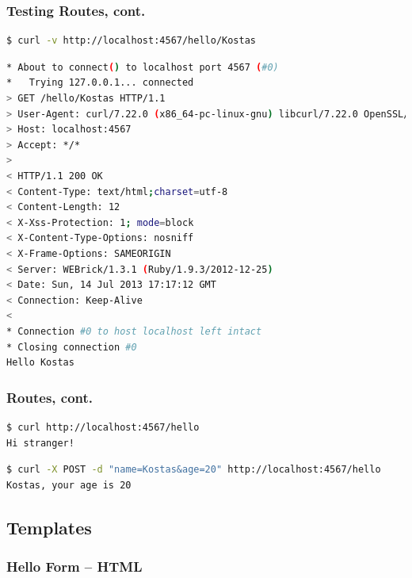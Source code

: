 \documentclass{beamer}
\begin{document}
\begin{frame}[fragile]\frametitle{Testing Routes, cont.}

  \begin{lstlisting}[language=bash, escapechar={^}]
$ curl -v http://localhost:4567/hello/Kostas
  \end{lstlisting}

  \begin{lstlisting}[language=bash, basicstyle=\tiny, escapechar={^}]
* About to connect() to localhost port 4567 (#0)
*   Trying 127.0.0.1... connected
> GET /hello/Kostas HTTP/1.1
> User-Agent: curl/7.22.0 (x86_64-pc-linux-gnu) libcurl/7.22.0 OpenSSL/1.0.1 zlib/1.2.3.4 libidn/1.23 librtmp/2.3
> Host: localhost:4567
> Accept: */*
> 
< HTTP/1.1 200 OK 
< Content-Type: text/html;charset=utf-8
< Content-Length: 12
< X-Xss-Protection: 1; mode=block
< X-Content-Type-Options: nosniff
< X-Frame-Options: SAMEORIGIN
< Server: WEBrick/1.3.1 (Ruby/1.9.3/2012-12-25)
< Date: Sun, 14 Jul 2013 17:17:12 GMT
< Connection: Keep-Alive
< 
* Connection #0 to host localhost left intact
* Closing connection #0
Hello Kostas
  \end{lstlisting}

\end{frame}




\begin{frame}[fragile]\frametitle{Routes, cont.}

  

  \begin{lstlisting}[language=bash, escapechar={^}]
$ curl http://localhost:4567/hello
Hi stranger!
  \end{lstlisting}
  
  \begin{lstlisting}[language=bash, escapechar={^}]
$ curl -X POST -d "name=Kostas&age=20" http://localhost:4567/hello
Kostas, your age is 20
  \end{lstlisting}
  
\end{frame}




\subsection{Templates}
\begin{frame}[fragile]\frametitle{Hello Form -- HTML}

  
  
\end{frame}
\end{document}
